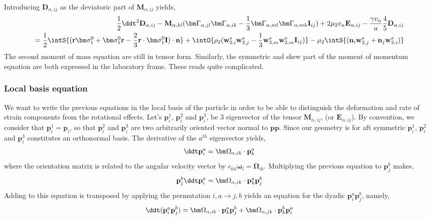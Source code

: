 Introducing $\textbf{D}_{\alpha,ij}$ as the deviatoric part of $\textbf{M}_{\alpha,ij}$ yields,
\begin{align*}
    \frac{1}{2}\ddt^2 \textbf{D}_{\alpha,ij}
    -   \textbf{M}_{\alpha,kl} 
    (\bm\Gamma_{\alpha,jl}\bm\Gamma_{\alpha,ik}  
    - \frac{1}{3}
    \bm\Gamma_{\alpha,ml}\bm\Gamma_{\alpha,mk}  
    \textbf{I}_{ij}
    )
    + 2 \mu_2 v_\alpha \textbf{E}_{\alpha,ij}
    - \frac{\gamma v_\alpha }{a} 
    \frac{4  }{5} \textbf{D}_{\alpha,ij}
    \\
    = 
    \frac{1}{2}\intS{(\textbf{r}\bm\sigma_1^0 + \bm\sigma_1^0\textbf{r} - \frac{2}{3}\textbf{r}\cdot \bm\sigma_1^0 \textbf{I})\cdot \textbf{n}} 
    + \intO{\rho_2 (\textbf{w}_{2,i}^s\textbf{w}_{2,j}^s - \frac{1}{3}\textbf{w}_{2,m}^s\textbf{w}_{2,m}^s \textbf{I}_{ij}) }
    - \mu_2 \intS{(\textbf{n}_i \textbf{w}_{2,j}^s + \textbf{n}_j \textbf{w}_{2,i}^s)}\\
\end{align*}
The second moment of mass equation are still in tensor form. 
Similarly, the symmetric and skew part of the moment of momentum equation are both expressed in the laboratory frame. 
These reads quite complicated.
\subsubsection*{Local basis equation}
We want to write the previous equations in the local basis of the particle in order to be able to distinguish the deformation and rate of strain components from the rotational effects. 
Let's $\textbf{p}^1_i$, $\textbf{p}^2_i$ and $\textbf{p}^3_i$, be $3$ eigenvector of the tensor $\textbf{M}_{\alpha,ij}$, (or $\textbf{E}_{\alpha,ij}$). 
By convention, we consider that $\textbf{p}^1_i = \textbf{p}_i$, so that $\textbf{p}^2_i$ and $\textbf{p}^3_i$ are two arbitrarily oriented vector normal to $\textbf{pp}$. 
Since our geometry is for aft symmetric $\textbf{p}^1_i$, $\textbf{p}^2_i$ and $\textbf{p}^3_i$ constitutes an orthonormal basis. 
The derivative of the $a^{th}$ eigenvector yields, 
\begin{align*}
    \ddt \textbf{p}_i^a = \bm\Omega_{\alpha,ik}\cdot\textbf{p}_k^a
\end{align*}
where the orientation matrix is related to the angular velocity vector by $\epsilon_{kil}\bm\omega_l = \bm\Omega_{ik}$. 
Multiplying the previous equation to $\textbf{p}_j^b$ makes, 
\begin{align*}
    \textbf{p}_j^b\ddt \textbf{p}_i^a 
    = \bm\Omega_{\alpha,ik}\cdot\textbf{p}_k^a\textbf{p}_j^b\\
\end{align*}
Adding to this equation is transposed by applying the permutation  $i,a \to j,b$ yields an equation for the dyadic $ \textbf{p}_i^a \textbf{p}_j^b$, namely, 
\begin{align*}
    \ddt (\textbf{p}_i^a \textbf{p}_j^b)
    = \bm\Omega_{\alpha,ik}\cdot\textbf{p}_k^a\textbf{p}_j^b
    + \bm\Omega_{\alpha,jk}\cdot\textbf{p}_k^b\textbf{p}_i^a\\
\end{align*}

